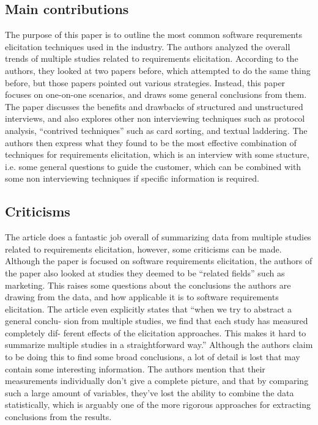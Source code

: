 \documentclass[letterpaper,12pt]{article}
\begin{document}
\subsection{Main contributions} %
The purpose of this paper is to outline the most common software requrements
elicitation techniques used in the industry. The authors analyzed the overall
trends of multiple studies related to requirements elicitation. According to the
authors, they looked at two papers before, which attempted to do the same thing
before, but those papers pointed out various strategies. Instead, this paper
focuses on one-on-one scenarios, and draws some general conclusions from them.
The paper discusses the benefits and drawbacks of structured and unstructured
interviews, and also explores other non interviewing techniques such as protocol
analysis, ``contrived techniques'' such as card sorting, and textual laddering.
The authors then express what  they found to be the most effective combination
of techniques for requirements elicitation, which is an interview with some
stucture, i.e. some general questions to guide the customer, which can be
combined with some non  interviewing techniques if specific information is
required.


\subsection{Criticisms} %

The article does a fantastic job overall of summarizing data from multiple
studies related to requirements elicitation, however, some criticisms can be
made. Although the paper is focused on software requirements elicitation, the
authors of the paper also looked at studies they deemed to be ``related fields''
such as marketing. This raises some questions about the conclusions the authors
are drawing from the data, and how applicable it is to software requirements
elicitation. The article even  explicitly states that ``when we try to abstract
a general conclu- sion from multiple studies, we find that each study has
measured completely dif- ferent effects of the elicitation approaches. This
makes it hard to summarize multiple studies in a straightforward way.'' Although
the authors claim to be doing this to find some broad conclusions, a lot of
detail is lost that may contain some interesting information. The authors
mention that their measurements individually don't give a complete picture, and
that by comparing such a large amount of variables, they've lost the ability to
combine the data statistically, which is arguably one of the more rigorous
approaches for extracting conclusions from the results.
\end{document}
